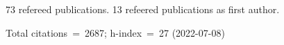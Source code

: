 73 refereed publications. 13 refeered publications as first author.

Total citations~=~2687; h-index~=~27 (2022-07-08)